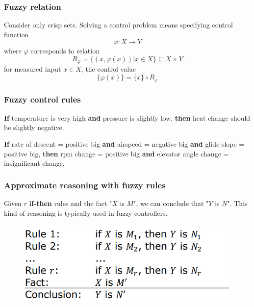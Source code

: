 \documentclass{article}
\begin{document}
\subsubsection{Fuzzy relation}
Consider only crisp sets. Solving a control problem means specifying control function
$$\varphi : X\rightarrow Y$$
where $\varphi$ corresponds to relation
$$R_{\varphi}=\{(x,\varphi(x))|x\in X\}\subseteq X\times Y$$
for measured input $x\in X$, the control value
$$\{\varphi(x)\}=\{x\}\circ R_\varphi$$

\subsubsection{Fuzzy control rules}
\textbf{If} temperature is very high \textbf{and} pressure is slightly low, \textbf{then}
heat change should be slightly negative.

\textbf{If} rate of descent = positive big \textbf{and} airspeed = negative big
\textbf{and} glide slope = positive big, \textbf{then} rpm change = positive big \textbf{and}
elevator angle change = insignificant change.

\subsubsection{Approximate reasoning with fuzzy rules}
Given $r$ \textbf{if-then} rules and the fact "$X$ is $M$", we can conclude that "$Y$ is $N$". This kind
of reasoning is typically used in fuzzy controllers.

\begin{figure}[H]
    \centering
    \includegraphics[scale=0.5]{images/schema-2.png}
\end{figure}
\end{document}

